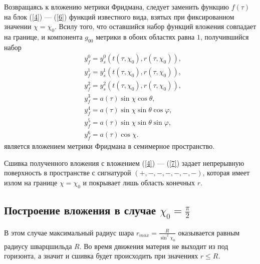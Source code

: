 \documentclass[12pt]{article}
\begin{document}
Возвращаясь к вложению метрики Фридмана, следует заменить функцию $f(\tau)$ на блок (\ref{4}) --- (\ref{6}) функций известного вида, взятых при фиксированном значении $\chi = \chi_0$. Всилу того, что оставшийся набор функций вложения совпадает на границе, и компонента $g_{00}$ метрики в обоих областях равна $1$, получившийся набор
\begin{align}
	&y^0_f = y^0_s(t(\tau, \chi_0), r(\tau, \chi_0)), \\
	&y^1_f = y^1_s(t(\tau, \chi_0), r(\tau, \chi_0)), \\
	&y^2_f = y^2_s(t(\tau, \chi_0), r(\tau, \chi_0)), \\
	&y^3_f = a(\tau) \sin{\chi} \cos{\theta}, \\
	&y^4_f = a(\tau) \sin{\chi} \sin{\theta} \cos{\varphi}, \\
	&y^5_f = a(\tau) \sin{\chi} \sin{\theta} \sin{\varphi}, \\
	&y^6_f = a(\tau) \cos{\chi}.
\end{align}
является вложением метрики Фридмана в семимерное пространство. 

Сшивка полученного вложения с вложением (\ref{4}) --- (\ref{7}) задает непрерывную поверхность в пространстве с сигнатурой $(+, -, -, -, -, -, -)$, которая имеет излом на границе  $\chi = \chi_0$ и покрывает лишь область конечных $r$. 

\subsection{ Построение вложения в случае $\chi_0 = \frac{\pi}{2}$}

В этом случае максимальный радиус шара $r_{max} = \frac{R}{\sin^2{\chi_0}}$ оказывается равным радиусу шварцшильда $R$. Во время движения материя не выходит из под горизонта, а значит и сшивка будет происходить при значениях $r \leqslant R$.
\end{document}
